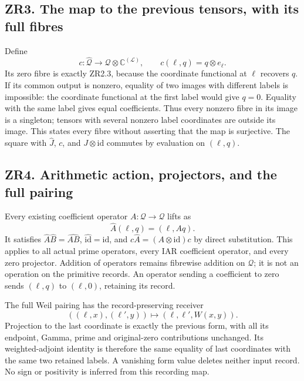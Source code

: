 \documentclass[
]{article}
\begin{document}
\subsection{ZR3. The map to the previous tensors, with its full
fibres}\label{zr3.-the-map-to-the-previous-tensors-with-its-full-fibres}

Define \[
c:\widehat{\mathcal Q}\longrightarrow
\mathcal Q\otimes\mathbb C^{(\mathcal L)},\qquad
c(\ell,q)=q\otimes e_\ell.
\tag{ZR3.1}
\] Its zero fibre is exactly ZR2.3, because the coordinate functional at
\(\ell\) recovers \(q\). If its common output is nonzero, equality of
two images with different labels is impossible: the coordinate
functional at the first label would give \(q=0\). Equality with the same
label gives equal coefficients. Thus every nonzero fibre in its image is
a singleton; tensors with several nonzero label coordinates are outside
its image. This states every fibre without asserting that the map is
surjective. The square with \(\widehat J\), \(c\), and
\(J\otimes\mathrm{id}\) commutes by evaluation on \((\ell,q)\).

\subsection{ZR4. Arithmetic action, projectors, and the full
pairing}\label{zr4.-arithmetic-action-projectors-and-the-full-pairing}

Every existing coefficient operator \(A:\mathcal Q\to\mathcal Q\) lifts
as \[
\widehat A(\ell,q)=(\ell,Aq).
\tag{ZR4.1}
\] It satisfies \(\widehat A\widehat B=\widehat{AB}\),
\(\widehat{\mathrm{id}}=\mathrm{id}\), and
\(c\widehat A=(A\otimes\mathrm{id})c\) by direct substitution. This
applies to all actual prime operators, every IAR coefficient operator,
and every zero projector. Addition of operators remains fibrewise
addition on \(\mathcal Q\); it is not an operation on the primitive
records. An operator sending a coefficient to zero sends \((\ell,q)\) to
\((\ell,0)\), retaining its record.

The full Weil pairing has the record-preserving receiver \[
((\ell,x),(\ell',y))\longmapsto(\ell,\ell',W(x,y)).
\tag{ZR4.2}
\] Projection to the last coordinate is exactly the previous form, with
all its endpoint, Gamma, prime and original-zero contributions
unchanged. Its weighted-adjoint identity is therefore the same equality
of last coordinates with the same two retained labels. A vanishing form
value deletes neither input record. No sign or positivity is inferred
from this recording map.
\end{document}
